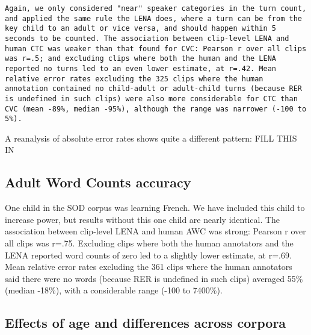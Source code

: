 \documentclass[english,floatsintext,man]{apa6}
\begin{document}
\begin{verbatim}
Again, we only considered "near" speaker categories in the turn count, and applied the same rule the LENA does, where a turn can be from the key child to an adult or vice versa, and should happen within 5 seconds to be counted. The association between clip-level LENA and human CTC was weaker than that found for CVC: Pearson r over all clips was r=.5; and excluding clips where both the human and the LENA reported no turns led to an even lower estimate, at r=.42. Mean relative error rates excluding the 325 clips where the human annotation contained no child-adult or adult-child turns (because RER is undefined in such clips) were also more considerable for CTC than CVC (mean -89%, median -95%), although the range was narrower (-100 to 5%).
\end{verbatim}

A reanalysis of absolute error rates shows quite a different pattern:
FILL THIS IN

\subsection{Adult Word Counts
accuracy}\label{adult-word-counts-accuracy}

One child in the SOD corpus was learning French. We have included this
child to increase power, but results without this one child are nearly
identical. The association between clip-level LENA and human AWC was
strong: Pearson r over all clips was r=.75. Excluding clips where both
the human annotators and the LENA reported word counts of zero led to a
slightly lower estimate, at r=.69. Mean relative error rates excluding
the 361 clips where the human annotators said there were no words
(because RER is undefined in such clips) averaged 55\% (median -18\%),
with a considerable range (-100 to 7400\%).

\subsection{Effects of age and differences across
corpora}\label{effects-of-age-and-differences-across-corpora}
\end{document}
